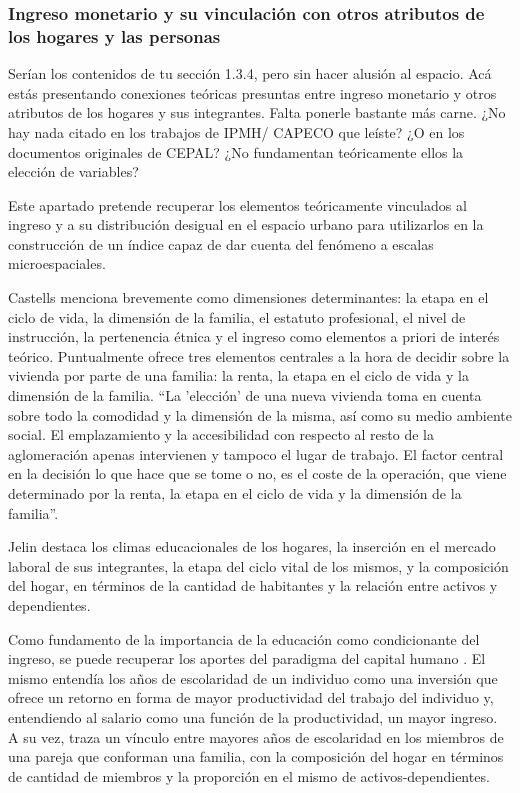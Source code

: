 	
	\subsubsection{Ingreso monetario y su vinculación con otros atributos de los hogares y las personas}\label{MT-Fundamentos}
	
	Serían los contenidos de tu sección 1.3.4, pero sin hacer alusión al espacio. Acá estás presentando conexiones teóricas presuntas entre ingreso monetario y otros atributos de los hogares y sus integrantes. Falta ponerle bastante más carne. ¿No hay nada citado en los trabajos de IPMH/ CAPECO que leíste? ¿O en los documentos originales de CEPAL? ¿No fundamentan teóricamente ellos la elección de variables?
	
	Este apartado pretende recuperar los elementos teóricamente vinculados al ingreso y a su distribución desigual en el espacio urbano para utilizarlos en la construcción de un índice capaz de dar cuenta del fenómeno a escalas microespaciales.
	
	Castells \citeyear{castells} menciona brevemente como dimensiones determinantes: la etapa en el ciclo de vida, la dimensión de la familia, el estatuto profesional, el nivel de instrucción, la pertenencia étnica y el ingreso como elementos a priori de interés teórico. Puntualmente ofrece tres elementos centrales a la hora de decidir sobre la vivienda por parte de una familia: la renta, la etapa en el ciclo de vida y la dimensión de la familia. “La 'elección' de una nueva vivienda toma en cuenta sobre todo la comodidad y la dimensión de la misma, así como su medio ambiente social. El emplazamiento y la accesibilidad con respecto al resto de la aglomeración apenas intervienen y tampoco el lugar de trabajo. El factor central en la decisión lo que hace que se tome o no, es el coste de la operación, que viene determinado por la renta, la etapa en el ciclo de vida y la dimensión de la familia”\cite[p.~215]{castells}.
	
	Jelin \citeyear{jelin} destaca los climas educacionales de los hogares, la inserción en el mercado laboral de sus integrantes, la etapa del ciclo vital de los mismos, y la composición del hogar, en términos de la cantidad de habitantes y la relación entre activos y dependientes.
	
	Como fundamento de la importancia de la educación como condicionante del ingreso, se puede recuperar los aportes del paradigma del capital humano \cite{mincer,beckar,schultz1961,schultz1962}. El mismo entendía los años de escolaridad de un individuo como una inversión que ofrece un retorno en forma de mayor productividad del trabajo del individuo y, entendiendo al salario como una función de la productividad, un mayor ingreso. A su vez, traza un vínculo entre mayores años de escolaridad en los miembros de una pareja que conforman una familia, con la composición del hogar en términos de cantidad de miembros y la proporción en el mismo de activos-dependientes.
	
